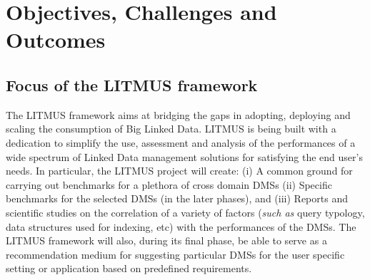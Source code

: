 \documentclass{llncs}
\newcommand{\todoproofread}[3]{
    \todoitemtemplate{#1}{#2}{Please proof read above section; #3}{inline}{yellow}
}
\newcommand{\todoitemtemplate}[5]{%
\todo[#4,color=#5,caption=X]{{#1}{ \textbf{{\tiny{for}} #2}:}{#3}}%
}
\begin{document}
    

    
        
    
    

\section{Objectives, Challenges and Outcomes}\label{Objectives}
    \subsection{Focus of the LITMUS framework}
        The LITMUS framework aims at bridging the gaps in adopting, deploying and scaling the consumption of Big Linked Data. LITMUS is being built with a dedication to simplify the use, assessment and analysis of the performances of a wide spectrum of Linked Data management solutions for satisfying the end user's needs.  In particular, the LITMUS project will create: (i) A common ground for carrying out benchmarks for a plethora of cross domain DMSs (ii) Specific benchmarks for the selected DMSs (in the later phases), and  (iii) Reports and scientific studies on the correlation of a variety of factors (\textit{such as} query typology, data structures used for indexing, etc) with the performances of the DMSs. The LITMUS framework will also, during its final phase, be able to serve as a recommendation medium for suggesting particular DMSs for the user specific setting or application based on predefined requirements. 
\end{document}
